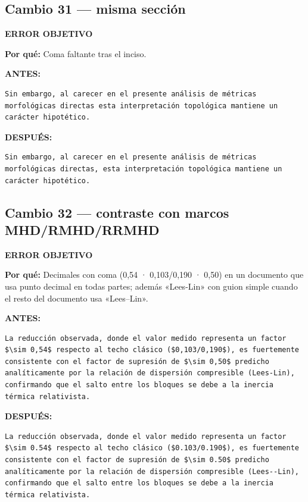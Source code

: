 \documentclass[11pt,a4paper]{article}
\begin{document}
\subsection*{Cambio 31 --- misma sección}
\colorbox{okbg}{\textbf{\footnotesize ERROR OBJETIVO}}

\textbf{Por qué:} Coma faltante tras el inciso.

\textcolor{antesline}{\textbf{ANTES:}}
\begin{Verbatim}[breaklines=true, breakanywhere=true, fontsize=\small, frame=leftline, rulecolor=\color{antesline}, framerule=1.2pt]
Sin embargo, al carecer en el presente análisis de métricas morfológicas directas esta interpretación topológica mantiene un carácter hipotético.
\end{Verbatim}
\textcolor{despline}{\textbf{DESPUÉS:}}
\begin{Verbatim}[breaklines=true, breakanywhere=true, fontsize=\small, frame=leftline, rulecolor=\color{despline}, framerule=1.2pt]
Sin embargo, al carecer en el presente análisis de métricas morfológicas directas, esta interpretación topológica mantiene un carácter hipotético.
\end{Verbatim}

\subsection*{Cambio 32 --- contraste con marcos MHD/RMHD/RRMHD}
\colorbox{okbg}{\textbf{\footnotesize ERROR OBJETIVO}}

\textbf{Por qué:} Decimales con coma (0,54 · 0,103/0,190 · 0,50) en un documento que usa punto decimal en todas partes; además «Lees-Lin» con guion simple cuando el resto del documento usa «Lees--Lin».

\textcolor{antesline}{\textbf{ANTES:}}
\begin{Verbatim}[breaklines=true, breakanywhere=true, fontsize=\small, frame=leftline, rulecolor=\color{antesline}, framerule=1.2pt]
La reducción observada, donde el valor medido representa un factor $\sim 0,54$ respecto al techo clásico ($0,103/0,190$), es fuertemente consistente con el factor de supresión de $\sim 0,50$ predicho analíticamente por la relación de dispersión compresible (Lees-Lin), confirmando que el salto entre los bloques se debe a la inercia térmica relativista.
\end{Verbatim}
\textcolor{despline}{\textbf{DESPUÉS:}}
\begin{Verbatim}[breaklines=true, breakanywhere=true, fontsize=\small, frame=leftline, rulecolor=\color{despline}, framerule=1.2pt]
La reducción observada, donde el valor medido representa un factor $\sim 0.54$ respecto al techo clásico ($0.103/0.190$), es fuertemente consistente con el factor de supresión de $\sim 0.50$ predicho analíticamente por la relación de dispersión compresible (Lees--Lin), confirmando que el salto entre los bloques se debe a la inercia térmica relativista.
\end{Verbatim}
\end{document}
